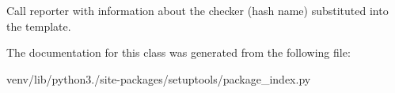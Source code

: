 \begin{DoxyVerb}Call reporter with information about the checker (hash name)
substituted into the template.
\end{DoxyVerb}
 

The documentation for this class was generated from the following file\+:\begin{DoxyCompactItemize}
\item 
venv/lib/python3./site-\/packages/setuptools/package\+\_\+index.\+py\end{DoxyCompactItemize}
